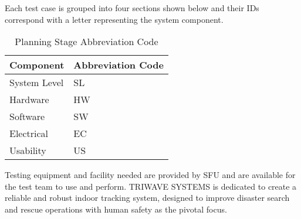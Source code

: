 Each test case is grouped into four sections shown below and their IDs correspond with a letter representing the system component. 


\bgroup
\def\arraystretch{1.3}
\begin{table}[H]
\centering
\begin{tabular}{ | m{7cm} | m{7cm}| } 
\hline
\rowcolor{lightgray} \textbf{Component} & \textbf{Abbreviation Code} \\ 
\hline
 System Level & SL\\ 
\hline
 Hardware & HW\\ 
\hline
 Software & SW\\  
\hline
 Electrical & EC\\
\hline
 Usability & US\\ 
\hline
\end{tabular}
\caption{Planning Stage Abbreviation Code}
\end{table}


\bigskip
Testing equipment and facility needed are provided by SFU and are available for the test team to use and perform. TRIWAVE SYSTEMS is dedicated to create a reliable and robust indoor tracking system, designed to improve disaster search and rescue operations with human safety as the pivotal focus.

